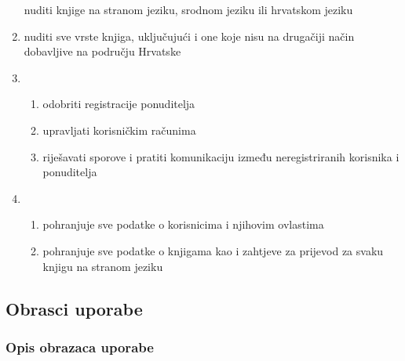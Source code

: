\begin{enumerate}
	nuditi knjige na stranom jeziku, srodnom jeziku ili hrvatskom jeziku
	
	
	\item {}
	
	nuditi sve vrste knjiga, uključujući i one koje nisu na drugačiji način dobavljive na području
	Hrvatske
	
	\item {}
	\begin{enumerate}
		\item odobriti registracije ponuditelja
		\item upravljati korisničkim računima
		\item riješavati sporove i pratiti komunikaciju između neregistriranih korisnika i ponuditelja
	\end{enumerate}
		
	\item {}
	
	\begin{enumerate}
		
		\item pohranjuje sve podatke o korisnicima i njihovim ovlastima
		
		\item pohranjuje sve podatke o knjigama kao i zahtjeve za prijevod za svaku knjigu na stranom jeziku
		
	\end{enumerate}
	
\end{enumerate}

\eject 



\subsection{Obrasci uporabe}

\subsubsection{Opis obrazaca uporabe}


